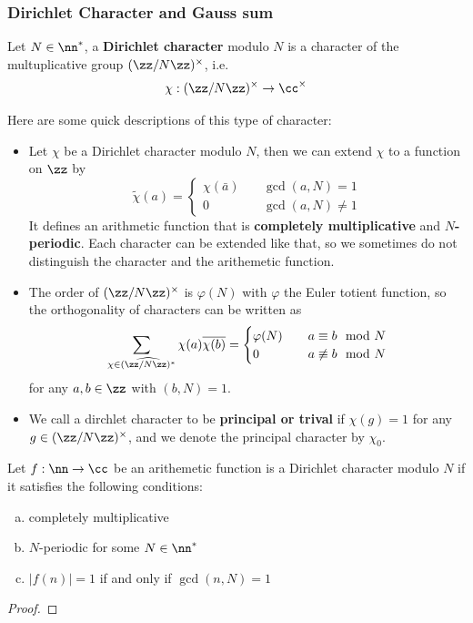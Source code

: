 \subsubsection{Dirichlet Character and Gauss sum}

\begin{definition}
    Let \(N \in \nn^*\), a \textbf{Dirichlet character} modulo \(N\) is a character of the multuplicative group \((\zz/N\zz)^\times\), i.e. \
\[\chi: (\zz/N\zz)^\times \to \cc^\times\]
\end{definition}

Here are some quick descriptions of this type of character: 
\begin{itemize}

    \item Let \(\chi\) be a Dirichlet character modulo \(N\), then we can extend \(\chi\) to a function on \(\zz\) by \[\tilde{\chi}(a) = \begin{cases}
        \chi(\bar{a}) \quad &\gcd(a,N) = 1 \\
        0 \quad &\gcd(a,N) \neq 1
    \end{cases}\]
    It defines an arithmetic function that is \textbf{completely multiplicative} and \textbf{\(N\)-periodic}. Each character can be extended like that, so we sometimes do not distinguish the character and the arithemetic function.
    
    \item The order of \((\zz/N\zz)^\times\) is \(\varphi(N)\) with \(\varphi\) the Euler totient function, so the orthogonality of characters can be written as
    \[\sum_{\chi \in \widehat{(\zz/N\zz)^*}}\chi(a)\overline{\chi(b)} = \begin{cases}
    \varphi(N)  \quad &a \equiv b \mod N \\
    0 \quad &a \not\equiv b \mod N
    \end{cases} \]
    for any \(a,b \in \zz\) with \((b,N) = 1\).

    \item We call a dirchlet character to be \textbf{principal or trival} if \(\chi(g) = 1\) for any \(g \in (\zz/N\zz)^\times\), and we denote the principal character by \(\chi_0\).
\end{itemize}


\begin{theorem}
    Let \(f: \nn \to \cc\) be an arithemetic function is a Dirichlet character modulo \(N\) if it satisfies the following conditions:
    \begin{enumerate} [(a)]
        \item completely multiplicative
        \item \(N\)-periodic for some \(N \in \nn^*\)
        \item \(|f(n)| = 1\) if and only if \(\gcd(n,N) = 1\)
    \end{enumerate}
\end{theorem}
\begin{proof}
    
\end{proof}


